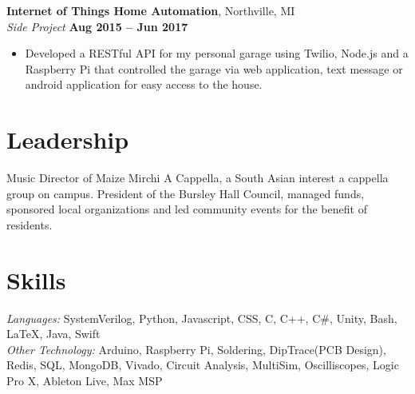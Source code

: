 \documentclass[margin,line]{resume}
\begin{document}
\begin{resume}
\begin{itemize}
\end{itemize}
\fi
	\textbf{Internet of Things Home Automation}, Northville, MI \vspace{2mm}\\\vspace{1mm}%
	\textsl{Side Project} \hfill \textbf{Aug 2015 -- Jun 2017}
	\begin{itemize}
		\item Developed a RESTful API for my personal garage using Twilio, Node.js and a Raspberry Pi that controlled the garage via web application, text message or android application for easy access to the house.
	\end{itemize}

\iffalse
    \textbf{Mobile Application Development}, Northville, MI \vspace{2mm}\\\vspace{1mm}%
    \textsl{Side Project} \hfill \textbf{Jan 2014 -- Aug 2014}
    \begin{itemize}
    	\item 	Developed and launched "Psychoblocks", a video game for the android platform using Java and the Libgdx cross­platform library. Used Google Play Game Services to connect data to Google Servers.
    \end{itemize}
	\fi
	\iffalse
    \textbf{Blind Sensor Navigation}, Northville, MI \vspace{2mm}\\\vspace{1mm}%
	\textsl{Side Project} \hfill \textbf{Nov 2013 -- Jun 2014}
	\begin{itemize}
		\item Built a device running on an ATMega328p micro­controller that helps a visually impaired individual navigate around their surroundings. Received 1st place IEEE award at the 2014 Science and Engineering Fair of Metro Detroit. 
	\end{itemize}
	\fi

   \section{\mysidestyle Leadership}
   	Music Director of Maize Mirchi A Cappella, a South Asian interest a cappella group on campus. President of the Bursley Hall Council, managed funds, sponsored local organizations and led community events for the benefit of residents.
   	
   	
   \vspace{-2mm}

    \section{\mysidestyle Skills}

    \emph{Languages:} SystemVerilog, Python, Javascript, CSS, C,  C++, C\#, Unity, Bash, \LaTeX, Java, Swift \\
    \emph{Other Technology:}  Arduino, Raspberry Pi, Soldering, DipTrace(PCB Design), Redis, SQL, MongoDB, Vivado, Circuit Analysis, MultiSim, Oscilliscopes, Logic Pro X, Ableton Live, Max MSP
\end{resume}
\end{document}
